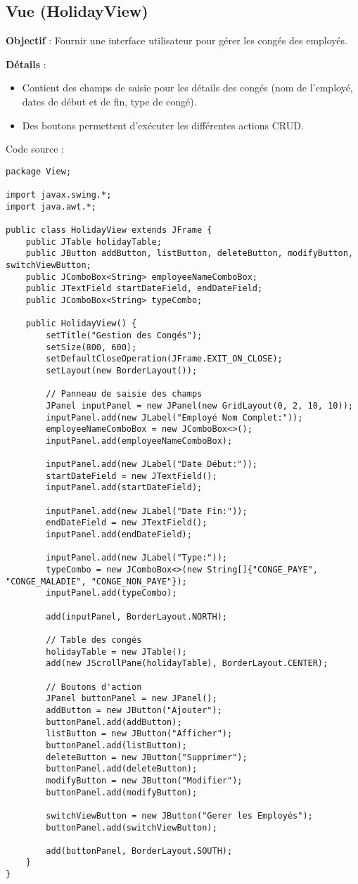 \documentclass[a4paper,12pt]{article}
\begin{document}
\subsection{Vue (HolidayView)}
\textbf{Objectif} : Fournir une interface utilisateur pour gérer les congés des employés.

\textbf{Détails} :
\begin{itemize}
    \item Contient des champs de saisie pour les détails des congés (nom de l'employé, dates de début et de fin, type de congé).
    \item Des boutons permettent d'exécuter les différentes actions CRUD.
\end{itemize}

Code source :
\begin{lstlisting}
package View;

import javax.swing.*;
import java.awt.*;

public class HolidayView extends JFrame {
    public JTable holidayTable;
    public JButton addButton, listButton, deleteButton, modifyButton, switchViewButton;
    public JComboBox<String> employeeNameComboBox;
    public JTextField startDateField, endDateField;
    public JComboBox<String> typeCombo;

    public HolidayView() {
        setTitle("Gestion des Congés");
        setSize(800, 600);
        setDefaultCloseOperation(JFrame.EXIT_ON_CLOSE);
        setLayout(new BorderLayout());

        // Panneau de saisie des champs
        JPanel inputPanel = new JPanel(new GridLayout(0, 2, 10, 10));
        inputPanel.add(new JLabel("Employé Nom Complet:"));
        employeeNameComboBox = new JComboBox<>();
        inputPanel.add(employeeNameComboBox);

        inputPanel.add(new JLabel("Date Début:"));
        startDateField = new JTextField();
        inputPanel.add(startDateField);

        inputPanel.add(new JLabel("Date Fin:"));
        endDateField = new JTextField();
        inputPanel.add(endDateField);

        inputPanel.add(new JLabel("Type:"));
        typeCombo = new JComboBox<>(new String[]{"CONGE_PAYE", "CONGE_MALADIE", "CONGE_NON_PAYE"});
        inputPanel.add(typeCombo);

        add(inputPanel, BorderLayout.NORTH);

        // Table des congés
        holidayTable = new JTable();
        add(new JScrollPane(holidayTable), BorderLayout.CENTER);

        // Boutons d'action
        JPanel buttonPanel = new JPanel();
        addButton = new JButton("Ajouter");
        buttonPanel.add(addButton);
        listButton = new JButton("Afficher");
        buttonPanel.add(listButton);
        deleteButton = new JButton("Supprimer");
        buttonPanel.add(deleteButton);
        modifyButton = new JButton("Modifier");
        buttonPanel.add(modifyButton);

        switchViewButton = new JButton("Gerer les Employés");
        buttonPanel.add(switchViewButton);

        add(buttonPanel, BorderLayout.SOUTH);
    }
}
\end{lstlisting}
\end{document}
